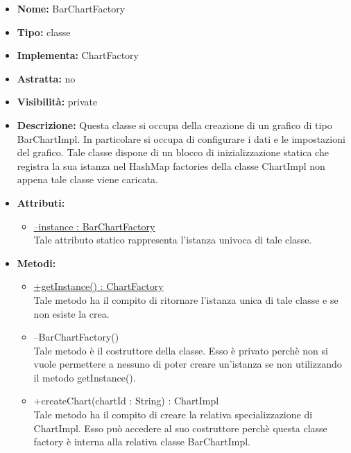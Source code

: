 			
			\begin{itemize}
			\item \textbf{Nome:} BarChartFactory
			\item \textbf{Tipo:} classe
			
		\item \textbf{Implementa:}
		ChartFactory
		\item \textbf{Astratta:}
		no
			\item \textbf{Visibilità:} private
			\item \textbf{Descrizione:} Questa classe si occupa della creazione di un grafico di tipo BarChartImpl. In particolare si occupa di configurare i dati e le impostazioni del grafico. Tale classe dispone di un blocco di inizializzazione statica che registra la sua istanza nel HashMap factories della classe ChartImpl non appena tale classe viene caricata.
			\item \textbf{Attributi:}
				\begin{itemize}
				\setlength{\itemsep}{5pt}
				
					\item[\ding{111}] \underline{--instance : BarChartFactory} \\ [1mm] Tale attributo statico rappresenta l'istanza univoca di tale classe.
				\end{itemize}
		
			\item \textbf{Metodi:}
				\begin{itemize}
				\setlength{\itemsep}{5pt}
				
					\item[\ding{111}] {\underline{+getInstance() : ChartFactory}} \\ [1mm] Tale metodo ha il compito di ritornare l'istanza unica di tale classe e se non esiste la crea.
					\item[\ding{111}] {{--BarChartFactory()}} \\ [1mm] Tale metodo è il costruttore della classe. Esso è privato perchè non si vuole permettere a nessuno di poter creare un'istanza se non utilizzando il metodo getInstance().
					\item[\ding{111}] {{+createChart(chartId : String) : ChartImpl}} \\ [1mm] Tale metodo ha il compito di creare la relativa specializzazione di ChartImpl. Esso può accedere al suo costruttore perchè questa classe factory è interna alla relativa classe BarChartImpl.
				\end{itemize}
		
			\end{itemize}

